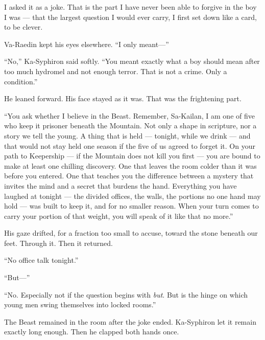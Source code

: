 I asked it as a joke. That is the part I have never been able to forgive in the boy I was --- that the largest question I would ever carry, I first set down like a card, to be clever.\par

Va-Raedin kept his eyes elsewhere. ``I only meant---''\par

``No,'' Ka-Syphiron said softly. ``You meant exactly what a boy should mean after too much hydromel and not enough terror. That is not a crime. Only a condition.''\par

He leaned forward. His face stayed as it was. That was the frightening part.\par

``You ask whether I believe in the Beast. Remember, Sa-Kailan, I am one of five who keep it prisoner beneath the Mountain. Not only a shape in scripture, nor a story we tell the young. A thing that is held --- tonight, while we drink --- and that would not stay held one season if the five of us agreed to forget it.
On your path to Keepership --- if the Mountain does not kill you first --- you are bound to make at least one chilling discovery. One that leaves the room colder than it was before you entered. One that teaches you the difference between a mystery that invites the mind and a secret that burdens the hand. Everything you have laughed at tonight --- the divided offices, the walls, the portions no one hand may hold --- was built to keep it, and for no smaller reason. When your turn comes to carry your portion of that weight, you will speak of it like that no more.''\par

His gaze drifted, for a fraction too small to accuse, toward the stone beneath our feet. Through it. Then it returned.\par

``No office talk tonight.''\par

``But---''\par

``No. Especially not if the question begins with \emph{but}. But is the hinge on which young men swing themselves into locked rooms.''\par

The Beast remained in the room after the joke ended. Ka-Syphiron let it remain exactly long enough. Then he clapped both hands once.\par


